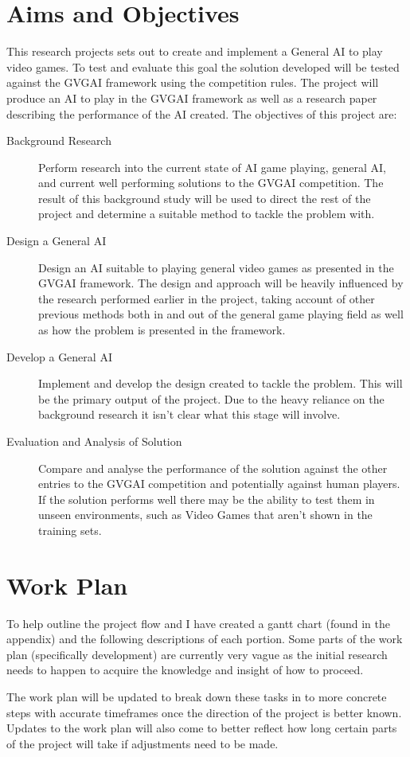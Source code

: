 \documentclass[a4paper]{article}
\begin{document}
\section{Aims and Objectives}
This research projects sets out to create and implement a General AI to play video games.
To test and evaluate this goal the solution developed will be tested against the GVGAI framework using the competition rules.\cite{GVGAI2014}
The project will produce an AI to play in the GVGAI framework as well as a research paper describing the performance of the AI created.
\bigbreak
\noindent The objectives of this project are:
\begin{description}
    \item [Background Research]
    Perform research into the current state of AI game playing, general AI, and current well performing solutions to the GVGAI competition.
    The result of this background study will be used to direct the rest of the project and determine a suitable method to tackle the problem with.

    \item [Design a General AI]
    Design an AI suitable to playing general video games as presented in the GVGAI framework.
    The design and approach will be heavily influenced by the research performed earlier in the project, taking account of other previous methods both in and out of the general game playing field as well as how the problem is presented in the framework.

    \item [Develop a General AI]
    Implement and develop the design created to tackle the problem.
    This will be the primary output of the project.
Due to the heavy reliance on the background research it isn't clear what this stage will involve.

    \item [Evaluation and Analysis of Solution]
    Compare and analyse the performance of the solution against the other entries to the GVGAI competition and potentially against human players.
    If the solution performs well there may be the ability to test them in unseen environments, such as Video Games that aren't shown in the training sets.
\end{description}

\section{Work Plan}
To help outline the project flow and I have created a gantt chart (found in the appendix) and the following descriptions of each portion.
Some parts of the work plan (specifically development) are currently very vague as the initial research needs to happen to acquire the knowledge and insight of how to proceed.
\par
The work plan will be updated to break down these tasks in to more concrete steps with accurate timeframes once the direction of the project is better known.
Updates to the work plan will also come to better reflect how long certain parts of the project will take if adjustments need to be made.
\end{document}
